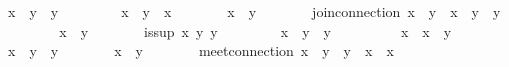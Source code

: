 \begin{isabellebody}
\ {\isachardoublequoteopen}x\ {\isasymsqinter}\ y\ {\isasymsqsubseteq}\ y{\isachardoublequoteclose}\ \isacommand{{\isachardot}{\isachardot}}\isamarkupfalse%
\isanewline
\ \ \ \ \isamarkupfalse%
\ \isamarkupfalse%
\ {\isachardoublequoteopen}x\ {\isasymsqinter}\ y\ {\isacharequal}\ x{\isachardoublequoteclose}\isanewline
\ \ \ \ \isamarkupfalse%
\ \isamarkupfalse%
\ {\isachardoublequoteopen}x\ {\isasymsqsubseteq}\ y{\isachardoublequoteclose}\ \isacommand{{\isachardot}}\isamarkupfalse%
\isanewline
\ \ \isamarkupfalse%
\isanewline
\isanewline
\ \ \isamarkupfalse%
\ join{\isacharunderscore}connection{\isacharcolon}\ {\isachardoublequoteopen}{\isacharparenleft}x\ {\isasymsqsubseteq}\ y{\isacharparenright}\ {\isacharequal}\ {\isacharparenleft}x\ {\isasymsqunion}\ y\ {\isacharequal}\ y{\isacharparenright}{\isachardoublequoteclose}\isanewline
\ \ \isamarkupfalse%
\isanewline
\ \ \ \ \isamarkupfalse%
\ {\isachardoublequoteopen}x\ {\isasymsqsubseteq}\ y{\isachardoublequoteclose}\isanewline
\ \ \ \ \isamarkupfalse%
\ \isamarkupfalse%
\ {\isachardoublequoteopen}is{\isacharunderscore}sup\ x\ y\ y{\isachardoublequoteclose}\ \isacommand{{\isachardot}{\isachardot}}\isamarkupfalse%
\isanewline
\ \ \ \ \isamarkupfalse%
\ \isamarkupfalse%
\ {\isachardoublequoteopen}x\ {\isasymsqunion}\ y\ {\isacharequal}\ y{\isachardoublequoteclose}\ \isacommand{{\isachardot}{\isachardot}}\isamarkupfalse%
\isanewline
\ \ \isamarkupfalse%
\isanewline
\ \ \ \ \isamarkupfalse%
\ {\isachardoublequoteopen}x\ {\isasymsqsubseteq}\ x\ {\isasymsqunion}\ y{\isachardoublequoteclose}\ \isacommand{{\isachardot}{\isachardot}}\isamarkupfalse%
\isanewline
\ \ \ \ \isamarkupfalse%
\ \isamarkupfalse%
\ {\isachardoublequoteopen}x\ {\isasymsqunion}\ y\ {\isacharequal}\ y{\isachardoublequoteclose}\isanewline
\ \ \ \ \isamarkupfalse%
\ \isamarkupfalse%
\ {\isachardoublequoteopen}x\ {\isasymsqsubseteq}\ y{\isachardoublequoteclose}\ \isacommand{{\isachardot}}\isamarkupfalse%
\isanewline
\ \ \isamarkupfalse%
\isanewline
\isanewline
\ \ \isamarkupfalse%
\ meet{\isacharunderscore}connection{}{\isacharcolon}\ {\isachardoublequoteopen}{\isacharparenleft}x\ {\isasymsqsubseteq}\ y{\isacharparenright}\ {\isacharequal}\ {\isacharparenleft}y\ {\isasymsqinter}\ x\ {\isacharequal}\ x{\isacharparenright}{\isachardoublequoteclose}\isanewline

\end{isabellebody}
